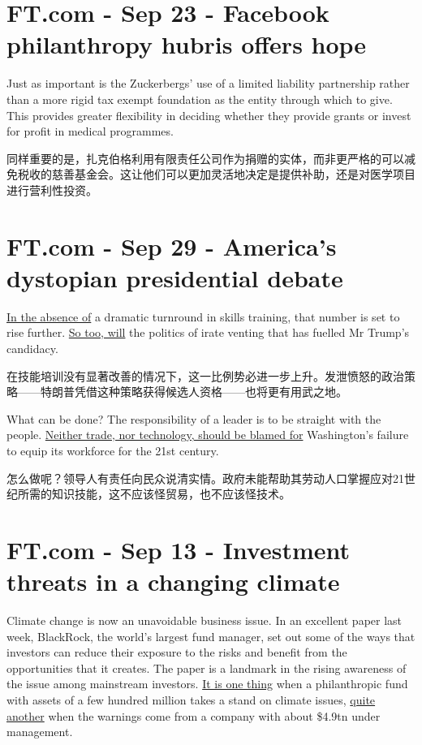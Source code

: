 \documentclass[UTF8]{ctexart}
\begin{document}
\section{FT.com - Sep 23 - Facebook philanthropy hubris offers hope}
Just as important is the Zuckerbergs’ use of a limited liability partnership rather than a more rigid tax exempt foundation as the entity through which to give. This provides greater flexibility in deciding whether they provide grants or invest for profit in medical programmes.

同样重要的是，扎克伯格利用有限责任公司作为捐赠的实体，而非更严格的可以减免税收的慈善基金会。这让他们可以更加灵活地决定是提供补助，还是对医学项目进行营利性投资。

\section{FT.com - Sep 29 - America's dystopian presidential debate}
\underline{In the absence of} a dramatic turnround in skills training, that number is set to rise further. \underline{So too, will} the politics of irate venting that has fuelled Mr Trump’s candidacy.

在技能培训没有显著改善的情况下，这一比例势必进一步上升。发泄愤怒的政治策略——特朗普凭借这种策略获得候选人资格——也将更有用武之地。

What can be done? The responsibility of a leader is to be straight with the people. \underline{Neither trade, nor technology, should be blamed for} Washington’s failure to equip its workforce for the 21st century.

怎么做呢？领导人有责任向民众说清实情。政府未能帮助其劳动人口掌握应对21世纪所需的知识技能，这不应该怪贸易，也不应该怪技术。

\section{FT.com - Sep 13 - Investment threats in a changing climate}
Climate change is now an unavoidable business issue. In an excellent paper last week, BlackRock, the world’s largest fund manager, set out some of the ways that investors can reduce their exposure to the risks and benefit from the opportunities that it creates. The paper is a landmark in the rising awareness of the issue among mainstream investors. \underline{It is one thing} when a philanthropic fund with assets of a few hundred million takes a stand on climate issues, \underline{quite another} when the warnings come from a company with about \$4.9tn under management.
\end{document}
